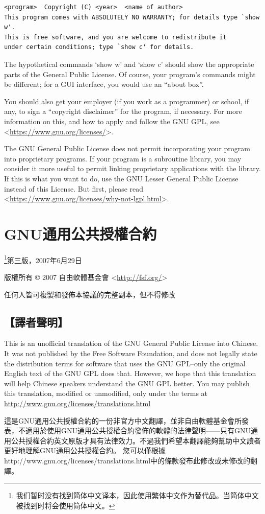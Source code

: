 \begin{verbatim}
<program>  Copyright (C) <year>  <name of author>
This program comes with ABSOLUTELY NO WARRANTY; for details type `show w'.
This is free software, and you are welcome to redistribute it
under certain conditions; type `show c' for details.
\end{verbatim}\par
The hypothetical commands `show w' and `show c' should show the appropriate parts of the General Public License. Of course, your program's commands might be different; for a GUI interface, you would use an “about box”.\par
You should also get your employer (if you work as a programmer) or school, if any, to sign a “copyright disclaimer” for the program, if necessary. For more information on this, and how to apply and follow the GNU GPL, see <\url{https://www.gnu.org/licenses/}>.\par
The GNU General Public License does not permit incorporating your program into proprietary programs. If your program is a subroutine library, you may consider it more useful to permit linking proprietary applications with the library. If this is what you want to do, use the GNU Lesser General Public License instead of this License. But first, please read <\url{https://www.gnu.org/licenses/why-not-lgpl.html}>.
\chapter{GNU通用公共授權合約}
\footnote{我们暂时没有找到简体中文译本，因此使用繁体中文作为替代品。当简体中文被找到时将会使用简体中文。}\cite{gplzht}第三版，2007年6月29日\par
版權所有 © 2007 自由軟體基金會 <\url{http://fsf.org/}>\par
任何人皆可複製和發佈本協議的完整副本，但不得修改\par
\section{【譯者聲明】}
This is an unofficial translation of the GNU General Public License into Chinese. It was not published by the Free Software Foundation, and does not legally state the distribution terms for software that uses the GNU GPL--only the original English text of the GNU GPL does that. However, we hope that this translation will help Chinese speakers understand the GNU GPL better. You may publish this translation, modified or unmodified, only under the terms at \url{http://www.gnu.org/licenses/translations.html}\par
這是GNU通用公共授權合約的一份非官方中文翻譯，並非自由軟體基金會所發表，不適用於使用GNU通用公共授權合約發佈的軟體的法律聲明——只有GNU通用公共授權合約英文原版才具有法律效力。不過我們希望本翻譯能夠幫助中文讀者更好地理解GNU通用公共授權合約。 您可以僅根據http://www.gnu.org/licenses/translations.html中的條款發布此修改或未修改的翻譯。
